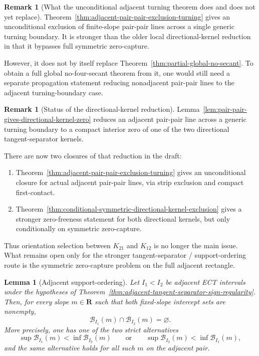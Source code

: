 \documentclass[11pt,a4paper]{amsart}
\theoremstyle{plain}
\newtheorem{lemma}[theorem]{Lemma}
\theoremstyle{definition}
\newtheorem{remark}[theorem]{Remark}
\begin{document}
\begin{remark}[What the unconditional adjacent turning theorem does and does not yet replace]
\label{rem:status-adjacent-pair-pair-turning}
Theorem~\ref{thm:adjacent-pair-pair-exclusion-turning} gives an unconditional
exclusion of finite-slope pair-pair lines across a single generic turning
boundary. It is stronger than the older local directional-kernel reduction in
that it bypasses full symmetric zero-capture.

However, it does not by itself replace
Theorem~\ref{thm:partial-global-no-secant}. To obtain a full global no-four-secant
theorem from it, one would still need a separate propagation statement reducing
nonadjacent pair-pair lines to the adjacent turning-boundary case.
\end{remark}

\begin{remark}[Status of the directional-kernel reduction]
\label{rem:audit-directional-kernel-orientation}
Lemma~\ref{lem:pair-pair-gives-directional-kernel-zero} reduces an adjacent
pair-pair line across a generic turning boundary to a compact interior zero of
one of the two directional tangent-separator kernels.

There are now two closures of that reduction in the draft:
\begin{enumerate}
\item Theorem~\ref{thm:adjacent-pair-pair-exclusion-turning} gives an
unconditional closure for actual adjacent pair-pair lines, via strip exclusion
and compact first-contact.

\item Theorem~\ref{thm:conditional-symmetric-directional-kernel-exclusion}
gives a stronger zero-freeness statement for both directional kernels, but only
conditionally on symmetric zero-capture.
\end{enumerate}

Thus orientation selection between $K_{21}$ and $K_{12}$ is no longer the
main issue. What remains open only for the stronger tangent-separator /
support-ordering route is the symmetric zero-capture problem on the full
adjacent rectangle.
\end{remark}

\begin{lemma}[Adjacent support-ordering]
\label{lem:adjacent-support-ordering}
Let $I_1<I_2$ be adjacent ECT intervals under the hypotheses of
Theorem~\ref{thm:adjacent-tangent-separator-sign-regularity}. Then, for every
slope $m\in\mathbf R$ such that both fixed-slope intercept sets are nonempty,
\[
\mathcal B_{I_1}(m)\cap \mathcal B_{I_2}(m)=\varnothing.
\]
More precisely, one has one of the two strict alternatives
\[
\sup \mathcal B_{I_1}(m)<\inf \mathcal B_{I_2}(m)
\qquad\text{or}\qquad
\sup \mathcal B_{I_2}(m)<\inf \mathcal B_{I_1}(m),
\]
and the same alternative holds for all such $m$ on the adjacent pair.
\end{lemma}
\end{document}
